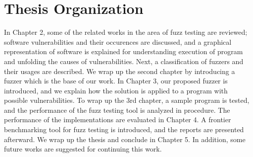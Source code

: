 \section{Thesis Organization}
\label{sec:1.3}

In Chapter 2, some of the related works in the area of fuzz testing are reviewed; software vulnerabilities and their occurences are discussed, and a graphical representation of software is explained for understanding execution of program and unfolding the causes of vulnerabilities. Next, a classification of fuzzers and their usages are described. We wrap up the second chapter by introducing a fuzzer which is the base of our work. In Chapter 3, our proposed fuzzer is introduced, and we explain how the solution is applied to a program with possible vulnerabilities. To wrap up the 3rd chapter, a sample program is tested, and the performance of the fuzz testing tool is analyzed in procedure. The performance of the implementations are evaluated in Chapter 4. A frontier benchmarking tool for fuzz testing is introduced, and the reports are presented afterward. We wrap up the thesis and conclude in Chapter 5. In addition, some future works are suggested for continuing this work.